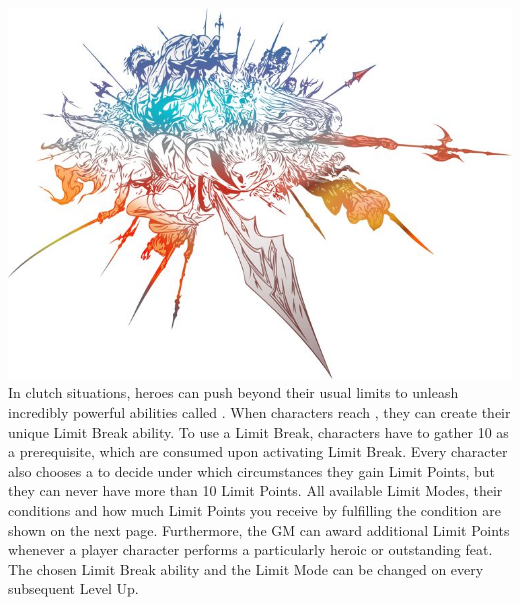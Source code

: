 %
%
\ofpar
%
\includegraphics[width=\columnwidth]{./art/images/ff14.jpg}
%
\ofpar
%
In clutch situations, heroes can push beyond their usual limits to unleash incredibly powerful abilities called .
When characters reach , they can create their unique Limit Break ability.
To use a Limit Break, characters have to gather 10  as a prerequisite, which are consumed upon activating Limit Break.
Every character also chooses a  to decide under which circumstances they gain Limit Points, but they can never have more than 10 Limit Points.
All available Limit Modes, their conditions and how much Limit Points you receive by fulfilling the condition are shown on the next page.
Furthermore, the GM can award additional Limit Points whenever a player character performs a particularly heroic or outstanding feat.
The chosen Limit Break ability and the Limit Mode can be changed on every subsequent Level Up.
%
\ofpar
%
